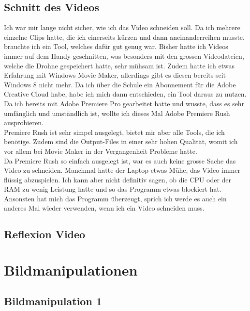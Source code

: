 \documentclass[11pt]{article}
\begin{document}
    \subsection{Schnitt des Videos}
    Ich war mir lange nicht sicher, wie ich das Video schneiden soll. Da ich mehrere einzelne Clips hatte, die ich einerseits kürzen und dann
    aneinanderreihen musste, brauchte ich ein Tool, welches dafür gut genug war. Bisher hatte ich Videos immer auf dem Handy geschnitten, was
    besonders mit den grossen Videodateien, welche die Drohne gespeichert hatte, sehr mühsam ist. Zudem hatte ich etwas Erfahrung mit Windows
    Movie Maker, allerdings gibt es diesen bereits seit Windows 8 nicht mehr. Da ich über die Schule ein Abonnement für die Adobe Creative Cloud
    habe, habe ich mich dann entschieden, ein Tool daraus zu nutzen. Da ich bereits mit Adobe Premiere Pro gearbeitet hatte und wusste, dass
    es sehr umfänglich und umständlich ist, wollte ich dieses Mal Adobe Premiere Rush ausprobieren.\\
    Premiere Rush ist sehr simpel ausgelegt, bietet mir aber alle Tools, die ich benötige. Zudem sind die Output-Files in einer sehr hohen
    Qualität, womit ich vor allem bei Movie Maker in der Vergangenheit Probleme hatte.\\
    Da Premiere Rush so einfach ausgelegt ist, war es auch keine grosse Sache das Video zu schneiden. Manchmal hatte der Laptop etwas Mühe,
    das Video immer flüssig abzuspielen. Ich kann aber nicht definitiv sagen, ob die CPU oder der RAM zu wenig Leistung hatte und so das Programm
    etwas blockiert hat.\\
    Ansonsten hat mich das Programm überzeugt, sprich ich werde es auch ein anderes Mal wieder verwenden, wenn ich ein Video schneiden muss.

    \subsection{Reflexion Video}

    \section{Bildmanipulationen}

    \subsection{Bildmanipulation 1}
\end{document}
